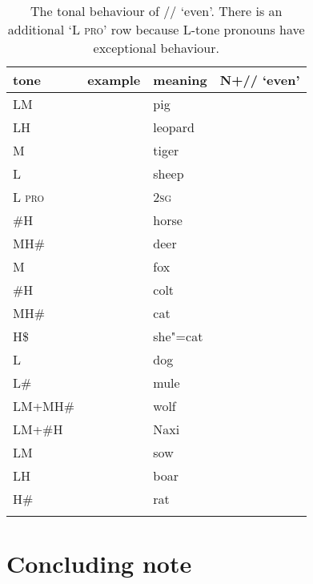 \begin{table}%
\caption{\label{tab:thetonalbehaviourofeven}The tonal behaviour of // ‘even’. There is an additional ‘L \textsc{pro}’ row because L-tone pronouns have exceptional behaviour.}
\begin{tabularx}{\textwidth}{ Q Q Q l }
\lsptoprule
	tone & example & meaning & N+// ‘even’\\ \midrule
	LM &  & pig & \\
	LH &  & leopard & \\
	M &  & tiger & \\
	L &  & sheep & \\
	L \textsc{pro} &  & \textsc{2sg} & \\
	\#H &  & horse & \\
	MH\# &  & deer & \\ \addlinespace \hdashline \addlinespace
	M &  & fox & \\
	\#H &  & colt & \\
	MH\# &  & cat & \\
	H\$ &  & she"=cat & \\
	L &  & dog & \\
	L\# &  & mule & \\
	LM+MH\# &  & wolf & \\
	LM+\#H &  & Naxi & \\
	LM &  & sow & \\
	LH &  & boar & \\
	H\# &  & rat & \\
\lspbottomrule
\end{tabularx}
\end{table}


\section{Concluding note}
\label{sec:asummary}
\largerpage

